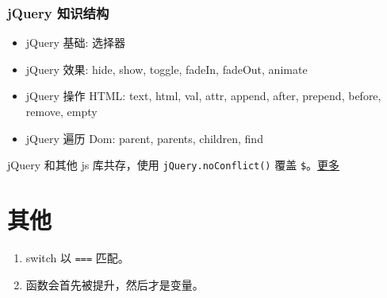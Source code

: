 \subsubsection{jQuery 知识结构}\label{jquery-ux77e5ux8bc6ux7ed3ux6784}

\begin{itemize}
\tightlist
\item
  jQuery 基础: 选择器
\item
  jQuery 效果: hide, show, toggle, fadeIn, fadeOut, animate
\item
  jQuery 操作 HTML: text, html, val, attr, append, after, prepend,
  before, remove, empty
\item
  jQuery 遍历 Dom: parent, parents, children, find
\end{itemize}

jQuery 和其他 js 库共存，使用 \texttt{jQuery.noConflict()} 覆盖
\texttt{\$}。\href{http://www.cnblogs.com/lostyu/p/3534751.html}{更多}

\section{其他}\label{ux5176ux4ed6}

\begin{enumerate}
\def\labelenumi{\arabic{enumi}.}
\tightlist
\item
  switch 以 \texttt{===} 匹配。
\item
  函数会首先被提升，然后才是变量。
\end{enumerate}
